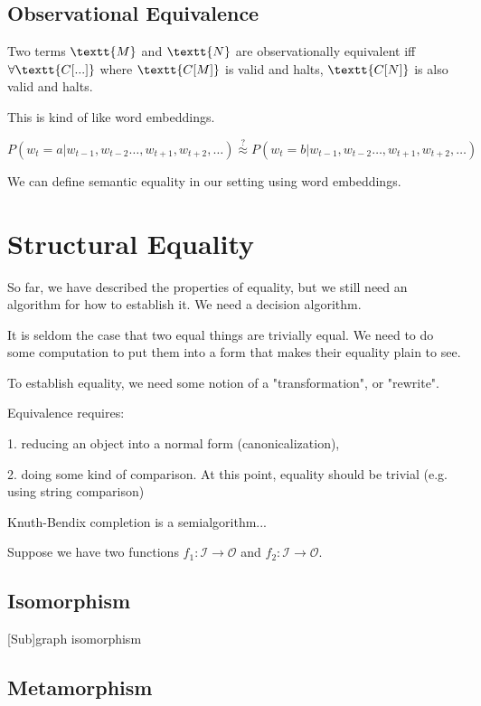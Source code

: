 \documentclass[11pt]{article}
\begin{document}
    \subsection{Observational Equivalence}

    Two terms $\textt{M}$ and $\textt{N}$ are observationally equivalent iff $\forall \textt{C[...]}$ where $\textt{C[M]}$ is valid and halts, $\textt{C[N]}$ is also valid and halts.

    This is kind of like word embeddings.

    $P(w_t = a | w_{t-1}, w_{t-2}\ldots, w_{t+1}, w_{t+2}, \ldots)\overset{?}{\approx} P(w_t = b | w_{t-1}, w_{t-2}\ldots, w_{t+1}, w_{t+2}, \ldots)$

    We can define semantic equality in our setting using word embeddings.

    \section{Structural Equality}\label{sec:structural}

    So far, we have described the properties of equality, but we still need an algorithm for how to establish it. We need a decision algorithm.

    It is seldom the case that two equal things are trivially equal. We need to do some computation to put them into a form that makes their equality plain to see.

    To establish equality, we need some notion of a "transformation", or "rewrite".

    Equivalence requires:

    1. reducing an object into a normal form (canonicalization),

    2. doing some kind of comparison. At this point, equality should be trivial (e.g. using string comparison)


    Knuth-Bendix completion is a semialgorithm...

    Suppose we have two functions $f_1: \mathcal{I} \rightarrow \mathcal{O}$ and $f_2: \mathcal{I}\rightarrow \mathcal{O}$.


    \subsection{Isomorphism}

    [Sub]graph isomorphism


    \subsection{Metamorphism}
\end{document}
